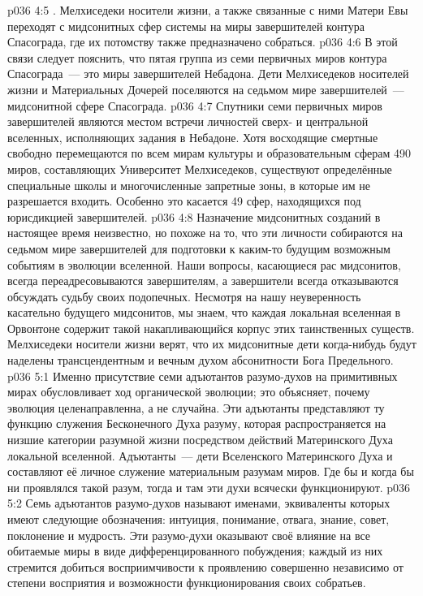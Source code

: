 \vs p036 4:5 \pc {}. Мелхиседеки носители жизни, а также связанные с ними Матери Евы переходят с мидсонитных сфер системы на миры завершителей контура Спасограда, где их потомству также предназначено собраться.
\vs p036 4:6 В этой связи следует пояснить, что пятая группа из семи первичных миров контура Спасограда~--- это миры завершителей Небадона. Дети Мелхиседеков носителей жизни и Материальных Дочерей поселяются на седьмом мире завершителей~--- мидсонитной сфере Спасограда.
\vs p036 4:7 Спутники семи первичных миров завершителей являются местом встречи личностей сверх- и центральной вселенных, исполняющих задания в Небадоне. Хотя восходящие смертные свободно перемещаются по всем мирам культуры и образовательным сферам 490 миров, составляющих Университет Мелхиседеков, существуют определённые специальные школы и многочисленные запретные зоны, в которые им не разрешается входить. Особенно это касается 49 сфер, находящихся под юрисдикцией завершителей.
\vs p036 4:8 \pc Назначение мидсонитных созданий в настоящее время неизвестно, но похоже на то, что эти личности собираются на седьмом мире завершителей для подготовки к каким\hyp{}то будущим возможным событиям в эволюции вселенной. Наши вопросы, касающиеся рас мидсонитов, всегда переадресовываются завершителям, а завершители всегда отказываются обсуждать судьбу своих подопечных. Несмотря на нашу неуверенность касательно будущего мидсонитов, мы знаем, что каждая локальная вселенная в Орвонтоне содержит такой накапливающийся корпус этих таинственных существ. Мелхиседеки носители жизни верят, что их мидсонитные дети когда\hyp{}нибудь будут наделены трансцендентным и вечным духом абсонитности Бога Предельного.
\vs p036 5:1 Именно присутствие семи адъютантов разумо\hyp{}духов на примитивных мирах обусловливает ход органической эволюции; это объясняет, почему эволюция целенаправленна, а не случайна. Эти адъютанты представляют ту функцию служения Бесконечного Духа разуму, которая распространяется на низшие категории разумной жизни посредством действий Материнского Духа локальной вселенной. Адъютанты~--- дети Вселенского Материнского Духа и составляют её личное служение материальным разумам миров. Где бы и когда бы ни проявлялся такой разум, тогда и там эти духи всячески функционируют.
\vs p036 5:2 Семь адъютантов разумо\hyp{}духов называют именами, эквиваленты которых имеют следующие обозначения: интуиция, понимание, отвага, знание, совет, поклонение и мудрость. Эти разумо\hyp{}духи оказывают своё влияние на все обитаемые миры в виде дифференцированного побуждения; каждый из них стремится добиться восприимчивости к проявлению совершенно независимо от степени восприятия и возможности функционирования своих собратьев.
